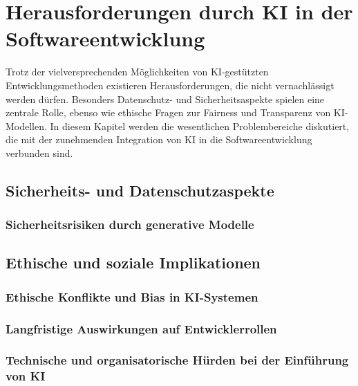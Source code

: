 \chapter{Herausforderungen durch KI in der Softwareentwicklung}
Trotz der vielversprechenden Möglichkeiten von KI-gestützten Entwicklungsmethoden existieren Herausforderungen, die nicht vernachlässigt werden dürfen. Besonders Datenschutz- und Sicherheitsaspekte spielen eine zentrale Rolle, ebenso wie ethische Fragen zur Fairness und Transparenz von KI-Modellen. In diesem Kapitel werden die wesentlichen Problembereiche diskutiert, die mit der zunehmenden Integration von KI in die Softwareentwicklung verbunden sind. 
\section{Sicherheits- und Datenschutzaspekte}


\subsection{Sicherheitsrisiken durch generative Modelle}


\section{Ethische und soziale Implikationen}


\subsection{Ethische Konflikte und Bias in KI-Systemen}


\subsection{Langfristige Auswirkungen auf Entwicklerrollen}


\subsection{Technische und organisatorische Hürden bei der Einführung von KI}
 
